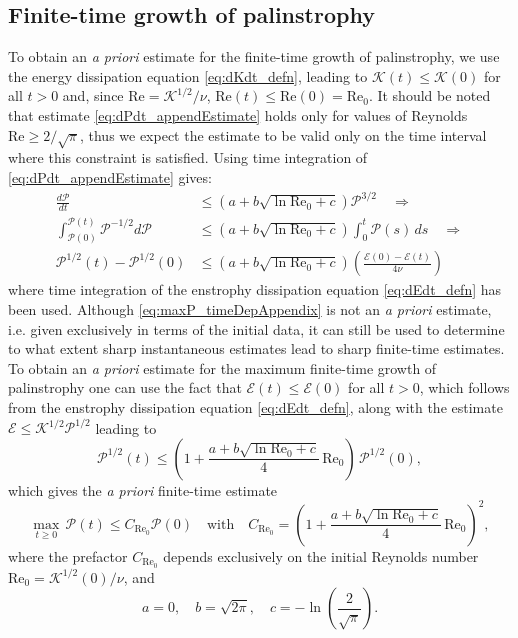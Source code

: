 \documentclass[11pt]{article}
\def\E{{\mathcal{E}}}
\def\P{{\mathcal{P}}}
\def\K{{\mathcal{K}}}
\newcommand{\Reyn}{\textrm{Re}}
\begin{document}
\subsection{Finite-time growth of palinstrophy}
\label{sec:maxP_Estimate}

To obtain an \emph{a priori} estimate for the finite-time growth of palinstrophy, we use the energy dissipation equation \eqref{eq:dKdt_defn}, leading to $\K(t) \leq \K(0)$ for all $t > 0$ and, since $\Reyn = \K^{1/2}/\nu$, $\Reyn(t) \leq \Reyn(0) = \Reyn_0$. It should be noted that estimate \eqref{eq:dPdt_appendEstimate} holds only for values of Reynolds $\Reyn \geq 2/\sqrt{\pi}$, thus we expect the estimate to be valid only on the time interval where this constraint is satisfied. Using time integration of \eqref{eq:dPdt_appendEstimate} gives:
\begin{align}
\frac{d\P}{dt} & \leq \left(a + b\sqrt{\ln\Reyn_0 + c}\right)\P^{3/2} \quad \Rightarrow \nonumber \\
\int_{\P(0)}^{\P(t)} \P^{-1/2} d\P & \leq \left( a + b\sqrt{\ln\Reyn_0+c} \right)\int_{0}^t\P(s) \,ds \quad \Rightarrow \nonumber\\
\P^{1/2}(t) - \P^{1/2}(0) & \leq \left( a + b\sqrt{\ln\Reyn_0+c} \right)\left(\frac{\E(0) - \E(t)}{4\nu}\right) \label{eq:maxP_timeDepAppendix}
\end{align} 
where time integration of the enstrophy dissipation equation \eqref{eq:dEdt_defn} has been used. Although \eqref{eq:maxP_timeDepAppendix} is not an \emph{a priori} estimate, i.e. given exclusively in terms of the initial data, it can still be used to determine to what extent sharp instantaneous estimates lead to sharp finite-time estimates. To obtain an \emph{a priori} estimate for the maximum finite-time growth of palinstrophy one can use  the fact that $\E(t) \leq \E(0)$ for all $t>0$, which follows from the enstrophy dissipation equation \eqref{eq:dEdt_defn}, along with the estimate $\E \leq \K^{1/2}\P^{1/2}$ leading to
\[
\P^{1/2}(t) \leq \left( 1 + \frac{a + b\sqrt{\ln\Reyn_0+c}}{4} \,\Reyn_0 \right) \, \P^{1/2}(0), 
\]
which gives the \emph{a priori} finite-time estimate
\begin{equation}\label{eq:finiteTime_appendEstimate}
\mathop{\max}_{t\geq0} \, \P(t) \leq  C_{\Reyn_0} \P(0) \quad\mbox{with}\quad 
C_{\Reyn_0} = \left(1+ \frac{a + b\sqrt{\ln\Reyn_0+c}}{4} \,\Reyn_0\right)^2,
\end{equation}
where the prefactor $C_{\Reyn_0}$ depends exclusively on the initial Reynolds number $\Reyn_0 = \K^{1/2}(0)/\nu$, and 
\[
a = 0,\quad b = \sqrt{2\pi},\quad c = -\ln\left(\frac{2}{\sqrt{\pi}}\right).
\]
\end{document}
